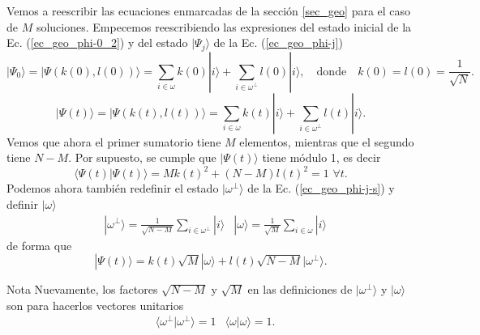 \documentclass[a4paper,11pt]{article} %
\numberwithin{equation}{section}
\begin{document}
Vemos a reescribir las ecuaciones enmarcadas de la sección \ref{sec_geo} para el caso de $M$ soluciones. Empecemos reescribiendo las expresiones del estado inicial de la Ec. (\ref{ec_geo_phi-0_2}) y del estado $|\Psi_j \rangle $ de la Ec. (\ref{ec_geo_phi-j}) 
\begin{equation} \label{ec_t-sols_phi-0}
\boxed{|\Psi_0 \rangle = | \Psi (k(0),l(0)) \rangle = \sum_{i \in \omega} k(0) |i \rangle + \sum_{i  \in \omega^{\perp}}  l(0)  |i \rangle}, \quad \text{donde} \quad \boxed{k(0) = l(0) = \frac{1}{\sqrt{N}}}.
\end{equation}
\begin{equation} \label{ec_t-sols_phi-j}
\boxed{|\Psi(t) \rangle = | \Psi (k(t),l(t)) \rangle = \sum_{i \in \omega} k(t) |i \rangle + \sum_{i  \in \omega^{\perp}} l(t) |i \rangle }.
\end{equation}
Vemos que ahora el primer sumatorio tiene $M$ elementos, mientras que el segundo tiene $N-M$. Por supuesto, se cumple que $|\Psi(t) \rangle$ tiene módulo 1, es decir
\begin{equation} \label{ec_t-sols_mod_1}
\langle \Psi(t) |\Psi(t) \rangle = \boxed{ M k(t)^2 + (N-M) l(t)^2 = 1 \, \, \forall t}.
\end{equation}
Podemos ahora también redefinir el estado $|\omega^{\perp} \rangle$ de la Ec. (\ref{ec_geo_phi-j-s}) y definir $| \omega \rangle$
\begin{align} \label{ec_t-sols_omega_omega-perp}
& \boxed{| \omega^{\perp}  \rangle = \frac{1}{\sqrt{N-M}}\sum_{i \in \omega^{\perp}}  |i \rangle}
& \boxed{| \omega  \rangle = \frac{1}{\sqrt{M}}\sum_{i \in \omega} | i \rangle}
\end{align}
de forma que
\begin{equation} \label{ec_t-sols_phi-j-s}
\boxed{|\Psi(t) \rangle =  k(t) \sqrt{M} |\omega \rangle + l(t) \sqrt{N-M} | \omega^{\perp}  \rangle}.
\end{equation}

	\begin{mybox}{Nota}
	Nuevamente, los factores $\sqrt{N-M}$ y $\sqrt{M}$ en las definiciones de $| \omega^{\perp} \rangle$ y $| \omega \rangle$ son para hacerlos vectores unitarios
	\begin{align}
	& \langle \omega^{\perp} | \omega^{\perp} \rangle = 1 
	& \langle \omega | \omega \rangle = 1 .
	\end{align}
	\end{mybox}
\end{document}
